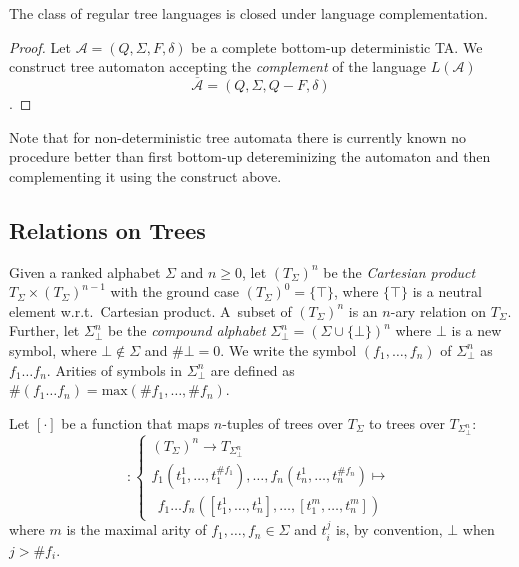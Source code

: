 \begin{theorem}
 The class of regular tree languages is closed under language complementation.
\end{theorem}

\begin{proof}
Let $\mathcal{A} = (Q, \Sigma, F, \delta)$ be a complete bottom-up deterministic
TA. We construct tree automaton accepting the \emph{complement} of the language
$L(\mathcal{A})$ 
\begin{equation}
\overline{\mathcal{A}} = (Q, \Sigma, Q - F, \delta)
\end{equation}.
\end{proof}

Note that for non-deterministic tree automata there is currently known no
procedure better than first bottom-up detereminizing the automaton and then
complementing it using the construct above.

 \subsection{Relations on Trees}

Given a ranked alphabet $\Sigma$ and $n \geq 0$, let $(T_\Sigma)^n$ be the
\emph{Cartesian product} $T_\Sigma \times (T_\Sigma)^{n-1}$ with the ground case
$(T_\Sigma)^0 = \{\top\}$, where $\{\top\}$ is a neutral element w.r.t.\ 
Cartesian product. A~subset of $(T_\Sigma)^n$ is an $n$-ary relation on
$T_\Sigma$. Further, let $\Sigma^n_\bot$ be the \emph{compound alphabet}
$\Sigma_\bot^n = (\Sigma \cup \{\bot\})^n$ where $\bot$ is a new symbol, where
$\bot \notin \Sigma$ and $\#\bot = 0$. We write the symbol
$(f_1,\ldots,f_n)$ of $\Sigma_\bot^n$ as $f_1\ldots f_n$. Arities of symbols in
$\Sigma_\bot^n$ are defined as $\#(f_1\ldots f_n) =
\text{max}(\#f_1,\ldots,\#f_n)$.

Let $[\cdot]$ be a function that maps $n$-tuples of trees over $T_\Sigma$ to
trees over $T_{\Sigma_\bot^n}$:
\begin{equation}
    [\cdot] :
    \begin{cases}
     (T_\Sigma)^n \rightarrow T_{\Sigma^n_\bot}\\
		 f_1(t_1^1,\ldots,t^{\#f_1}_1),\ldots,f_n(t_n^1,\ldots,t^{\#f_n}_n) \mapsto\\
		 \ \ f_1\ldots f_n([t_1^1,\ldots,t_n^1],\ldots,[t_1^m,\ldots,t_n^m])
   \end{cases}
\end{equation}
 where $m$ is the maximal arity of $f_1,\ldots,f_n \in \Sigma$ and $t_i^j$ is,
 by convention, $\bot$ when $j > \#f_i$.

